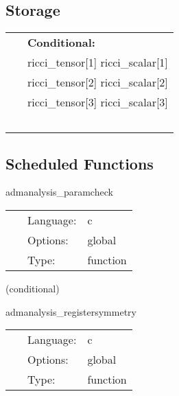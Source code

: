 \documentclass{article}
\begin{document}
\subsection*{Storage}

\hspace{5mm}

 \begin{tabular*}{160mm}{ll} 
~& {\bf Conditional:} \\ 
~ &  ricci\_tensor[1] ricci\_scalar[1]\\ 
~ &  ricci\_tensor[2] ricci\_scalar[2]\\ 
~ &  ricci\_tensor[3] ricci\_scalar[3]\\ 
~ & ~\\ 
\end{tabular*} 


\subsection*{Scheduled Functions}
\vspace{5mm}


\hspace{5mm} admanalysis\_paramcheck 

\hspace{5mm}{\it check that the metric\_type is recognised } 


\hspace{5mm}

 \begin{tabular*}{160mm}{cll} 
~ & Language:  & c \\ 
~ & Options:  & global \\ 
~ & Type:  & function \\ 
\end{tabular*} 


\vspace{5mm}

   (conditional) 

\hspace{5mm} admanalysis\_registersymmetry 

\hspace{5mm}{\it register symmetry of ricci tensor and scalar } 


\hspace{5mm}

 \begin{tabular*}{160mm}{cll} 
~ & Language:  & c \\ 
~ & Options:  & global \\ 
~ & Type:  & function \\ 
\end{tabular*} 
\end{document}
